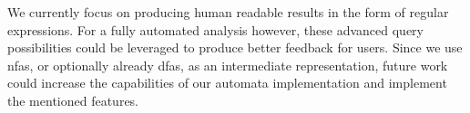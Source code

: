 We currently focus on producing human readable results in the form of regular expressions. For a fully automated analysis however, these advanced query possibilities could be leveraged to produce better feedback for users.
Since we use \acp{nfa}, or optionally already \acp{dfa}, as an intermediate representation, future work could increase the capabilities of our automata implementation and implement the mentioned features.

\begin{comment}
\begin{itemize}
\item How did you test/evaluate your PoC?
    \begin{itemize}
    \item E.g. case studies, large-scale studies, test bench, etc.
    \item What did you do to verify results (if applicable)
    \end{itemize}
\item What did you learn from these tests? Depends on your work. E.g.
    \begin{itemize}
    \item TP/TN/FP/FN rates
    \item Performance
    \item Results of your studies
    \item Interpretation of the results, lessons learned
    \end{itemize}
\item Limitations of the approach and your implementation. Any ideas on how to fix them?
\end{itemize}

Probably 5-15 pages
\end{comment}